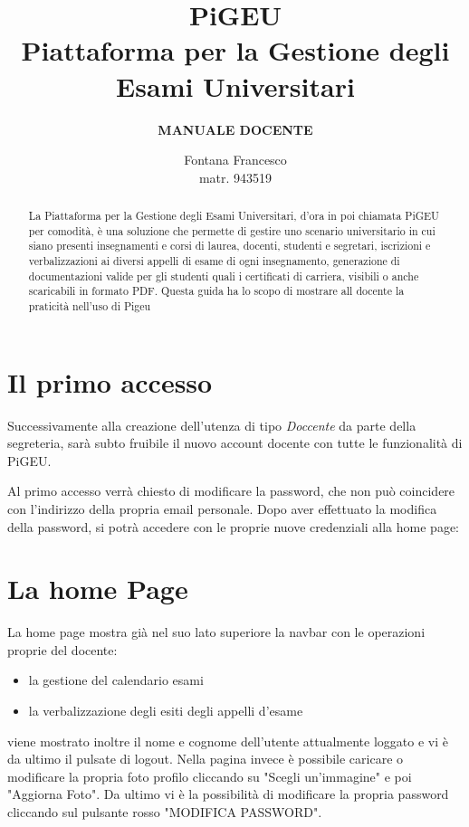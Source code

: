 \documentclass{article}
\title{PiGEU\\ Piattaforma per la Gestione degli Esami Universitari}
\author{\textbf{MANUALE DOCENTE}}
\date{Fontana Francesco \\ matr. 943519}
\begin{document}
    \maketitle

    \begin{abstract}

        La Piattaforma per la Gestione degli Esami Universitari, d'ora in poi chiamata PiGEU per comodità, è una soluzione che permette di gestire
        uno scenario universitario in cui siano presenti insegnamenti e corsi di laurea, docenti, studenti e segretari, iscrizioni e verbalizzazioni
        ai diversi appelli di esame di ogni insegnamento, generazione di documentazioni valide per gli studenti quali i certificati di carriera, visibili
        o anche scaricabili in formato PDF.
        Questa guida ha lo scopo di mostrare all docente la praticità nell'uso di Pigeu
    \end{abstract}

    \tableofcontents

    \section{Il primo accesso}
    Successivamente alla creazione dell'utenza di tipo \textit{Doccente} da parte della segreteria, sarà subto fruibile il nuovo account docente con tutte le funzionalità di PiGEU.

    Al primo accesso verrà chiesto di modificare la password, che non può coincidere con l'indirizzo della propria email personale. Dopo aver effettuato la modifica della password, si potrà accedere con le proprie nuove credenziali alla home page:

    \section{La home Page}
    La home page mostra già nel suo lato superiore la navbar con le operazioni proprie del docente:
    \begin{itemize}
        \item la gestione del calendario esami
        \item la verbalizzazione degli esiti degli appelli d'esame
    \end{itemize}
    viene mostrato inoltre il nome e cognome dell'utente attualmente loggato e vi è da ultimo il pulsate di logout.
    Nella pagina invece è possibile caricare o modificare la propria foto profilo cliccando su "Scegli un'immagine" e poi "Aggiorna Foto".
    Da ultimo vi è la possibilità di modificare la propria password cliccando sul pulsante rosso "MODIFICA PASSWORD".
\end{document}
